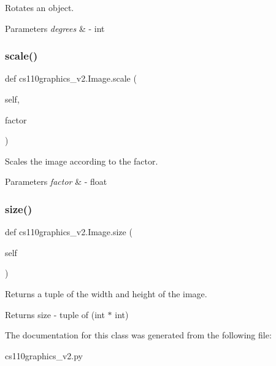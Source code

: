 Rotates an object. 


\begin{DoxyParams}{Parameters}
{\em degrees} & -\/ int \\
\hline
\end{DoxyParams}
\mbox{\label{classcs110graphics__v2_1_1Image_aa8ac3ee1d0b243e3398f949f8ff27cd6}} 
\subsubsection{\texorpdfstring{scale()}{scale()}}
{\footnotesize\ttfamily def cs110graphics\+\_\+v2.\+Image.\+scale (\begin{DoxyParamCaption}\item[{}]{self,  }\item[{}]{factor }\end{DoxyParamCaption})}



Scales the image according to the factor. 


\begin{DoxyParams}{Parameters}
{\em factor} & -\/ float \\
\hline
\end{DoxyParams}
\mbox{\label{classcs110graphics__v2_1_1Image_a3ae3fd4aea37228fd427d6efa6d92d36}} 
\subsubsection{\texorpdfstring{size()}{size()}}
{\footnotesize\ttfamily def cs110graphics\+\_\+v2.\+Image.\+size (\begin{DoxyParamCaption}\item[{}]{self }\end{DoxyParamCaption})}



Returns a tuple of the width and height of the image. 

\begin{DoxyReturn}{Returns}
size -\/ tuple of (int $\ast$ int) 
\end{DoxyReturn}


The documentation for this class was generated from the following file\+:\begin{DoxyCompactItemize}
\item 
cs110graphics\+\_\+v2.\+py\end{DoxyCompactItemize}
